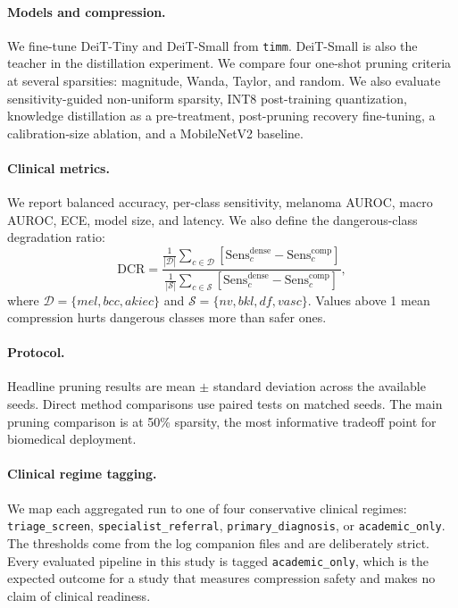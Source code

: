 \documentclass{article}
\newcommand{\mel}{\ensuremath{\textit{mel}}}
\newcommand{\bcc}{\ensuremath{\textit{bcc}}}
\newcommand{\akiec}{\ensuremath{\textit{akiec}}}
\newcommand{\nv}{\ensuremath{\textit{nv}}}
\newcommand{\DCR}{\ensuremath{\mathrm{DCR}}}
\begin{document}
\paragraph{Models and compression.}
We fine-tune DeiT-Tiny and DeiT-Small from \texttt{timm}. DeiT-Small is also the teacher in the distillation experiment. We compare four one-shot pruning criteria at several sparsities: magnitude, Wanda, Taylor, and random. We also evaluate sensitivity-guided non-uniform sparsity, INT8 post-training quantization, knowledge distillation as a pre-treatment, post-pruning recovery fine-tuning, a calibration-size ablation, and a MobileNetV2 baseline.

\paragraph{Clinical metrics.}
We report balanced accuracy, per-class sensitivity, melanoma AUROC, macro AUROC, ECE, model size, and latency. We also define the dangerous-class degradation ratio:
\begin{equation}
\DCR = \frac{\frac{1}{|\mathcal{D}|}\sum_{c \in \mathcal{D}}\left[\mathrm{Sens}^{\text{dense}}_c - \mathrm{Sens}^{\text{comp}}_c\right]}{\frac{1}{|\mathcal{S}|}\sum_{c \in \mathcal{S}}\left[\mathrm{Sens}^{\text{dense}}_c - \mathrm{Sens}^{\text{comp}}_c\right]},
\end{equation}
where $\mathcal{D}=\{\mel,\bcc,\akiec\}$ and $\mathcal{S}=\{\nv,\textit{bkl},\textit{df},\textit{vasc}\}$. Values above 1 mean compression hurts dangerous classes more than safer ones.

\paragraph{Protocol.}
Headline pruning results are mean $\pm$ standard deviation across the available seeds. Direct method comparisons use paired tests on matched seeds. The main pruning comparison is at 50\% sparsity, the most informative tradeoff point for biomedical deployment.

\paragraph{Clinical regime tagging.}
We map each aggregated run to one of four conservative clinical regimes: \texttt{triage\_screen}, \texttt{specialist\_referral}, \texttt{primary\_diagnosis}, or \texttt{academic\_only}. The thresholds come from the log companion files and are deliberately strict. Every evaluated pipeline in this study is tagged \texttt{academic\_only}, which is the expected outcome for a study that measures compression safety and makes no claim of clinical readiness.
\end{document}
